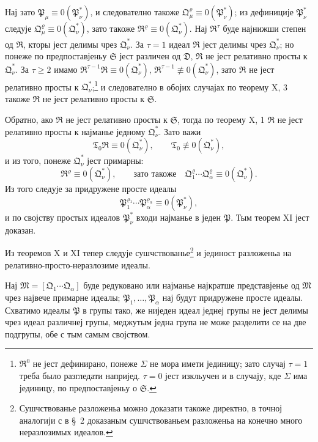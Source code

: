 ﻿\documentclass[11pt]{article}
\newcommand{\ideal}[1]{\mathfrak{#1}}
\begin{document}
Нај зато \(\ideal P_\mu\equiv0(\ideal P_\nu^*)\), и следователно такоже \(\ideal Q_\mu^{\varrho}\equiv0(\ideal P_\nu^*)\); из дефиниције \(\ideal P_\nu^*\) следује \(\ideal Q_\mu^{\varrho}\equiv0(\ideal Q_\nu^*)\), зато такоже \(\ideal R^{\varrho}\equiv0(\ideal Q_\nu^*)\). Нај \(\ideal R^\tau\) буде најнижши степен од \(\ideal R\), кторы јест делимы чрез \(\ideal Q_\nu^*\). За \(\tau=1\) идеал \(\ideal R\) јест делимы чрез \(\ideal Q_\nu^*\); но понеже по предпоставјеньу \(\ideal S\) јест различен од \(\ideal D\), \(\ideal R\) не јест релативно просты к \(\ideal Q_\nu^*\). За \(\tau\ge2\) имамо \(\ideal R^{\tau-1}\ideal R\equiv0(\ideal Q_\nu^*)\), \(\ideal R^{\tau-1}\not\equiv0(\ideal Q_\nu^*)\), зато \(\ideal R\) не јест релативно просты к \(\ideal Q_\nu^*\);\footnote{\(\ideal R^0\) не јест дефинирано, понеже \(\Sigma\) не мора имети јединицу; зато случај \(\tau=1\) треба было разгледати напријед. \(\tau=0\) јест изкльучен и в случају, кде \(\Sigma\) има јединицу, по предпоставјеньу о \(\ideal S\).} и следователно в обојих случајах по теорему X, 3 такоже \(\ideal R\) не јест релативно просты к \(\ideal S\).

Обратно, ако \(\ideal R\) не јест релативно просты к \(\ideal S\), тогда по теорему X, 1 \(\ideal R\) не јест релативно просты к најманье једному \(\ideal Q_\nu^*\). Зато важи
\[
 \ideal T_0\ideal R\equiv0(\ideal Q_\nu^*),\qquad
 \ideal T_0\not\equiv0(\ideal Q_\nu^*),
\]
и из того, понеже \(\ideal Q_\nu^*\) јест примарны:
\[
 \ideal R^\varrho\equiv0(\ideal Q_\nu^*),\qquad
 \text{зато такоже}\quad
 \ideal Q_1^{\varrho}\cdots\ideal Q_\alpha^{\varrho}\equiv0(\ideal Q_\nu^*).
\]
Из того следује за придружене просте идеалы
\[
 \ideal P_1^{\varrho_1}\cdots\ideal P_\alpha^{\varrho_\alpha}\equiv0(\ideal P_\nu^*),
\]
и по својству простых идеалов \(\ideal P_\nu^*\) входи најманье в једен \(\ideal P\). Тым теорем XI јест доказан.

Из теоремов X и XI тепер следује сушчствованье\footnote{Сушчствованье разложеньа можно доказати такоже директно, в точној аналогији с в \S~2 доказаным сушчствованьем разложеньа на конечно много неразлозимых идеалов.} и јединост разложеньа на релативно-просто-неразлозиме идеалы.

Нај \(\ideal M=[\ideal Q_1\cdots\ideal Q_\alpha]\) буде редуковано или најманье најкратше представјенье од \(\ideal M\) чрез највече примарне идеалы; \(\ideal P_1,\ldots,\ideal P_\alpha\) нај будут придружене просте идеалы. Схватимо идеалы \(\ideal P\) в групы тако, же ниједен идеал једнеј групы не јест делимы чрез идеал различнеј групы, меджутым једна група не може разделити се на две подгрупы, обе с тым самым својством.
\end{document}
